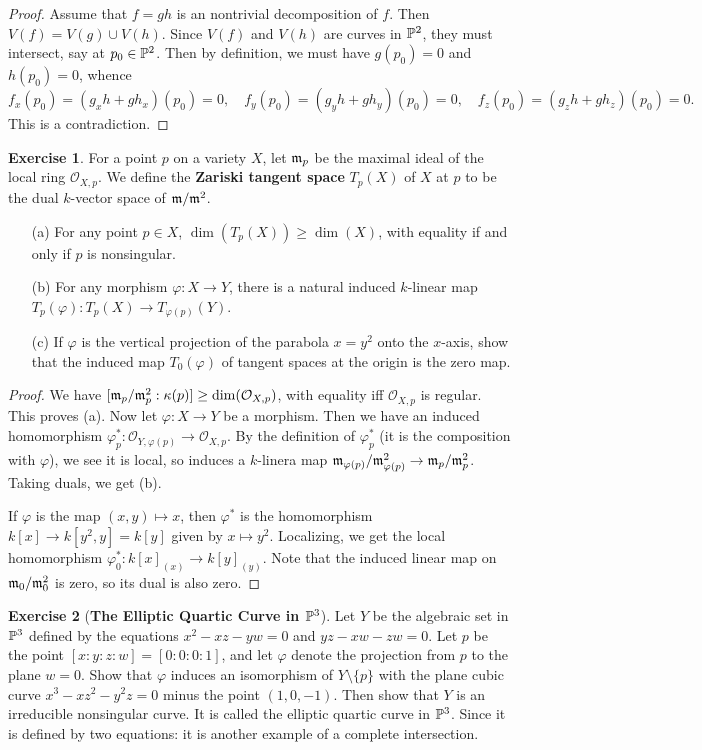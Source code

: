 \documentclass[11pt]{book}
\theoremstyle{definition}
\newtheorem{exercise}{Exercise}[section]
\begin{document}
\begin{proof}
Assume that $f=gh$ is an nontrivial decomposition of $f$. Then $V(f)=V(g)\cup V(h)$. Since $V(f)$ and $V(h)$ are curves in $\P^2$, they must intersect, say at $p_0\in\P^2$. Then by definition, we must have $g(p_0)=0$ and $h(p_0)=0$, whence
\[f_x(p_0)=(g_xh+gh_x)(p_0)=0,\quad f_y(p_0)=(g_yh+gh_y)(p_0)=0,\quad f_z(p_0)=(g_zh+gh_z)(p_0)=0.\]
This is a contradiction.
\end{proof}
\begin{exercise}
For a point $p$ on a variety $X$, let $\m_p$ be the maximal ideal of the local ring $\mathcal{O}_{X,p}$. We define the \textbf{Zariski tangent space} $T_p(X)$ of $X$ at $p$ to be the dual $k$-vector space of $\m/\m^2$.
\begin{itemize}
\item[(a)] For any point $p\in X$, $\dim(T_p(X))\geq\dim(X)$, with equality if and only if $p$ is nonsingular.
\item[(b)] For any morphism $\varphi:X\to Y$, there is a natural induced $k$-linear map $T_p(\varphi):T_p(X)\to T_{\varphi(p)}(Y)$.
\item[(c)] If $\varphi$ is the vertical projection of the parabola $x=y^2$ onto the $x$-axis, show that the induced map $T_0(\varphi)$ of tangent spaces at the origin is the zero map. 
\end{itemize}
\end{exercise}
\begin{proof}
We have $[\m_p/\m_p^2:\kappa(p)]\geq\dim(\mathcal{O}_{X,p})$, with equality iff $\mathcal{O}_{X,p}$ is regular. This proves (a). Now let $\varphi:X\to Y$ be a morphism. Then we have an induced homomorphism $\varphi_p^*:\mathcal{O}_{Y,\varphi(p)}\to\mathcal{O}_{X,p}$. By the definition of $\varphi_p^*$ (it is the composition with $\varphi$), we see it is local, so induces a $k$-linera map $\m_{\varphi(p)}/\m_{\varphi(p)}^2\to\m_p/\m_p^2$. Taking duals, we get (b).\par
If $\varphi$ is the map $(x,y)\mapsto x$, then $\varphi^*$ is the homomorphism $k[x]\to k[y^2,y]=k[y]$ given by $x\mapsto y^2$. Localizing, we get the local homomorphism $\varphi_0^*:k[x]_{(x)}\to k[y]_{(y)}$. Note that the induced linear map on $\m_0/\m_0^2$ is zero, so its dual is also zero.
\end{proof}
\begin{exercise}[\textbf{The Elliptic Quartic Curve in $\P^3$}]
Let $Y$ be the algebraic set in $\P^3$ defined by the equations $x^2-xz-yw=0$ and $yz-xw-zw=0$. Let $p$ be the point $[x:y:z:w]=[0:0:0:1]$, and let $\varphi$ denote the projection from $p$ to the plane $w=0$. Show that $\varphi$ induces an isomorphism of $Y\setminus\{p\}$ with the plane cubic curve $x^3-xz^2-y^2z=0$ minus the point $(1,0,-1)$. Then show that $Y$ is an irreducible nonsingular curve. It is called the elliptic quartic curve in $\P^3$. Since it is defined by two equations: it is another example of a complete intersection.
\end{exercise}
\end{document}
